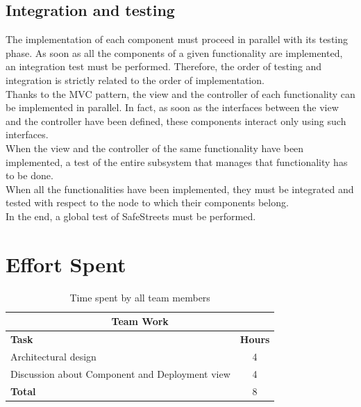 \documentclass{article}
\begin{document}
		\subsection{Integration and testing}
			The implementation of each component must proceed in parallel with its testing phase. As soon as all the components of a given functionality are implemented, an integration test must be performed. Therefore, the order of testing and integration is strictly related to the order of implementation.\\
			Thanks to the MVC pattern, the view and the controller of each functionality can be implemented in parallel. In fact, as soon as the interfaces between the view and the controller have been defined, these components interact only using such interfaces.\\
			When the view and the controller of the same functionality have been implemented, a test of the entire subsystem that manages that functionality has to be done.\\
			When all the functionalities have been implemented, they must be integrated and tested with respect to the node to which their components belong.\\
			In the end, a global test of SafeStreets must be performed.\\
	
	\clearpage
	\section{Effort Spent}
		\begin{table}[h]
			\centering
			\begin{tabular}{l c}
				\hline\hline
				\multicolumn{2}{c}{\textbf{Team Work}} \\
				\hline
				\textbf{Task} & \textbf{Hours} \\ [0.5ex]
				\hline
				Architectural design & 4  \\
				Discussion about Component and Deployment view & 4 \\
				\hline
				\textbf{Total} & 8  \\
				\hline
			\end{tabular}
			\caption{Time spent by all team members}
			\label{fig:Time spent by all team members}
		\end{table}
		
\end{document}
